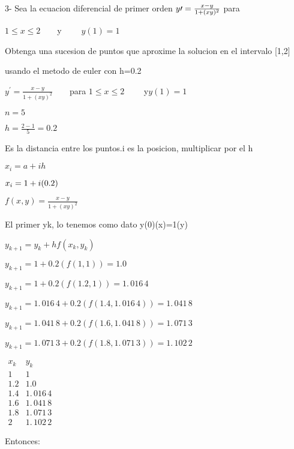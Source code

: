 \documentclass{article}
\begin{document}
3- Sea la ecuacion diferencial de primer orden $y\prime =\frac{x-y}{%
1+(xy)^{2}}$ para

$1\leq x\leq 2\qquad $y $\qquad y(1)=1$

Obtenga una sucesion de puntos que aproxime la solucion en el intervalo [1,2]

usando el metodo de euler con h=0.2

$y^{\prime }=\frac{x-y}{1+(xy)^{2}}\qquad $para \qquad $1\leq x\leq 2\qquad $%
y\qquad $y(1)=1$

$n=5$

$h=\frac{2-1}{5}=0.2\qquad \qquad $

Es la distancia entre los puntos.i es la posicion, multiplicar por el h

$x_{i}=a+ih$

$\bigskip x_{i}=1+i(0.2)$

\bigskip $f(x,y)=\frac{x-y}{1+(xy)^{2}}$

El primer yk, lo tenemos como dato y(0)(x)=1(y)

$y_{k+1}=y_{k}+hf(x_{k},y_{k})$

$y_{k+1}=1+0.2(f(1,1))=\allowbreak 1.0$

$y_{k+1}=1+0.2(f(1.2,1))=\allowbreak 1.\,\allowbreak 016\,4$

$y_{k+1}=\allowbreak 1.\,\allowbreak 016\,4\allowbreak
+0.2(f(1.4,\allowbreak 1.\,\allowbreak 016\,4\allowbreak ))=\allowbreak
1.\,\allowbreak 041\,8$

$y_{k+1}=\allowbreak 1.\,\allowbreak 041\,8+0.2(f(1.6,\allowbreak
1.\,\allowbreak 041\,8))=\allowbreak 1.\,\allowbreak 071\,3$

$y_{k+1}=1.\,\allowbreak 071\,3+0.2(f(1.8,\allowbreak 1.\,\allowbreak
071\,3))=\allowbreak 1.\,\allowbreak 102\,2$

$%
\begin{array}{cc}
x_{k} & y_{k} \\ 
1 & 1 \\ 
1.2 & \allowbreak 1.0 \\ 
1.4 & \allowbreak 1.\,\allowbreak 016\,4 \\ 
1.6 & 1.\,\allowbreak 041\,8 \\ 
1.8 & 1.\,\allowbreak 071\,3 \\ 
2 & \allowbreak 1.\,\allowbreak 102\,2%
\end{array}%
$

Entonces:
\end{document}
